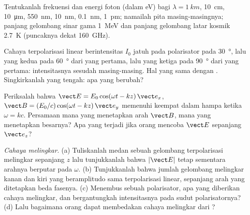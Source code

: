 \begin{exercise}[$\star$]\label{exo:b2:plane-waves-polarization:2}
Tentukanlah frekuensi dan energi foton (dalam eV) bagi $\lambda = \qty{1}{km}$, \qty{10}{cm},
\qty{10}{\micro m}, \qty{550}{nm}, \qty{10}{nm}, \qty{0.1}{nm}, \qty{1}{pm}; namailah
pita masing-masingnya; panjang gelombang sinar gama \qty{1}{MeV} dan panjang gelombang latar
kosmik \qty{2.7}{K} (puncaknya dekat \qty{160}{GHz}).
\end{exercise}

\begin{exercise}[$\star$]\label{exo:b2:plane-waves-polarization:3}
Cahaya terpolarisasi linear berintensitas $I_0$ jatuh pada polarisator pada
\qty{30}{\degree}, lalu yang kedua pada \qty{60}{\degree} dari yang pertama, lalu yang
ketiga pada \qty{90}{\degree} dari yang pertama: intensitasnya sesudah masing-masing. Hal yang sama dengan
. Singkirkanlah yang tengah: apa yang berubah?
\end{exercise}

\begin{exercise}[$\star$]\label{exo:b2:plane-waves-polarization:4}
Periksalah bahwa $\vect E = E_0\cos(\omega t - kz)\,\vect e_x$, $\vect B = (E_0/c)\cos(\omega t
- kz)\,\vect e_y$ memenuhi keempat  dalam hampa ketika $\omega =
kc$. Persamaan mana yang menetapkan arah $\vect B$, mana yang menetapkan
besarnya? Apa yang terjadi jika orang mencoba $\vect E$ sepanjang $\vect e_z$?
\end{exercise}

\begin{exercise}[$\star\star$]\label{exo:b2:plane-waves-polarization:5}
\emph{Cahaya melingkar.} (a) Tuliskanlah medan sebuah gelombang terpolarisasi
melingkar sepanjang $z$ lalu tunjukkanlah bahwa $|\vect E|$ tetap sementara arahnya
berputar pada $\omega$. (b) Tunjukkanlah bahwa jumlah gelombang melingkar kanan dan kiri
yang beramplitudo sama terpolarisasi linear, sepanjang arah yang ditetapkan
beda fasenya. (c) Menembus sebuah polarisator, apa yang diberikan cahaya melingkar,
dan bergantungkah intensitasnya pada sudut polarisatornya? (d) Lalu bagaimana
orang dapat membedakan cahaya melingkar dari ?
\end{exercise}

